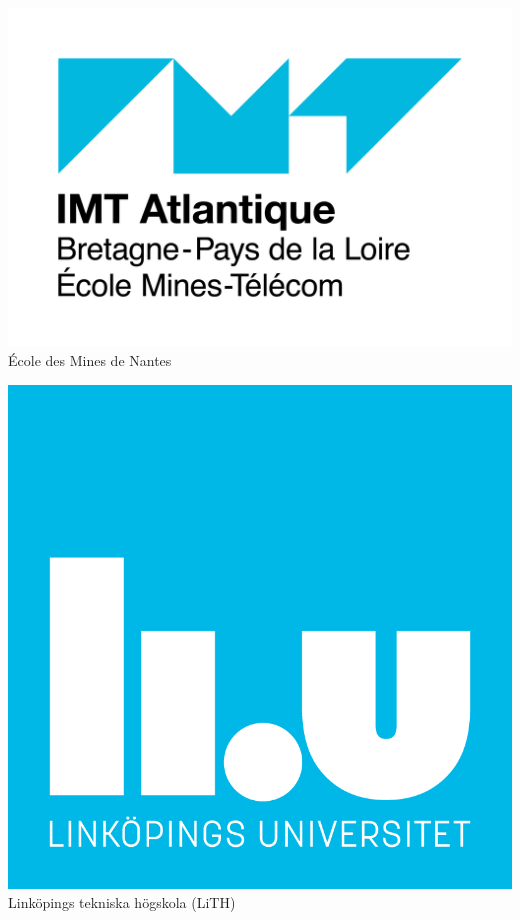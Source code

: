 \documentclass[11pt,a4paper,sans]{moderncv}
\begin{document}
{  \hfill
  \begin{minipage}[t]{0.24\linewidth}
    \centering
    \includegraphics[width=0.8\linewidth]{../../images/IMT_Atlantique_logo_1.png}\\
    \scriptsize École des Mines de Nantes
  \end{minipage}
  \hfill
  \begin{minipage}[t]{0.24\linewidth}
    \centering
    \includegraphics[width=0.9\linewidth]{../../images/liu-logo.png}\\
    \scriptsize Linköpings tekniska högskola (LiTH)
  \end{minipage}
}

%
%

\end{document}
